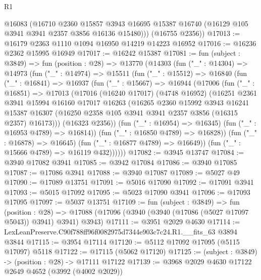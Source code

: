\begin{lexlean}{R1}
\begin{coremodule}
        @16083
        (@16710
          @2360
          @15857
          @3943
          @16695
          @15387
          @16740
          (@16129 @105 @3941 @3941 @2357 @3856 @16136 @15480)))
      (@16755 @2356))
@17013 := @16179 @2363 @1110 @1094 @16950 @14219 @14223 @16952
@17016 := @16236 @2362 @15995 @16949
@17017 := @16242 @15387
@17081 := fun (subject : @3849) =>
  fun (position : @28) =>
  @13770
    (@14303
      (fun ("_" : @14304) =>
      @14973
        (fun ("_" : @14974) =>
        @15511
          (fun ("_" : @15512) =>
          @16840
            (fun ("_" : @16841) =>
            @16937
              (fun ("_" : @15667) =>
              @16944
                (@17006
                  (fun ("_" : @16851) =>
                  @17013
                    (@17016
                      (@16240 @17017)
                      (@4748 @16952)
                      (@16251
                        @2361
                        @3941
                        @15994
                        @16160
                        @17017
                        @16263
                        (@16265
                          @2360
                          @15992
                          @3943
                          @16241
                          @15387
                          @16307
                          (@16250 @2358 @105 @3941 @3941 @2357 @3856 (@16315 @2357) @16173)))
                      (@16323 @2356))
                    (fun ("_" : @16954) => @16345)
                    (fun ("_" : @16953 @4789) => @16814))
                  (fun ("_" : @16850 @4789) => @16828))
                (fun ("_" : @16878) => @16645)
                (fun ("_" : @16877 @4789) => @16649))
              (fun ("_" : @15666 @4789) => @16119 @432))))))
@17082 := @3945 @13747
@17084 := @3940 @17082 @3941
@17085 := @3942 @17084
@17086 := @3940 @17085
@17087 := @17086 @3941
@17088 := @3940 @17087
@17089 := @5027 @49
@17090 := @17089 @13751
@17091 := @5016 @17090
@17092 := @17091 @3941
@17093 := @5015 @17092
@17095 := @5023 @17090 @3941
@17096 := @17093 @17095
@17097 := @5037 @13751
@17109 := fun (subject : @3849) =>
  fun (position : @28) =>
  @17088 (@17096 (@3940 (@3940 (@17086 (@5027 @17097 @5043)) @3941) @3941) @3943)
@17111 := @3951 @2029 @4630
@17114 := LexLeanPreserve.C90f788ff96f0082975d7344e903c7c24.R1.__fits_63 @3894 @3844
@17115 := @3954 @17114
@17120 := @5112 @17092 @17095 (@5115 @17097) @5118
@17122 := @17115 (@5062 @17120)
@17125 := (subject : @3849) -> (position : @28) -> @17111 @17122
@17139 := @3968
    @2029
    @4630
    @17122
    @2649
    @4652
    (@3992 (@4002 @2029))

\end{coremodule}
\end{lexlean}
